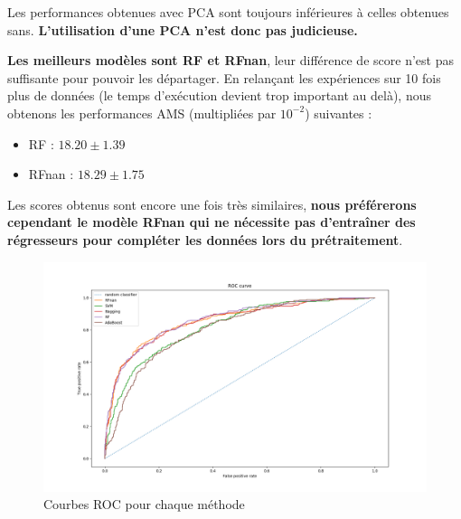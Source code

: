 \documentclass[12pt]{article}
\begin{document}
Les performances obtenues avec PCA sont toujours inférieures à celles obtenues
sans. \textbf{L'utilisation d'une PCA n'est donc pas judicieuse.}


\textbf{Les meilleurs modèles sont RF et RFnan}, leur différence de score n'est
pas suffisante pour pouvoir les départager.  En relançant les expériences sur 10
fois plus de données (le temps d'exécution devient trop important au delà), nous
obtenons les performances AMS (multipliées par $10^{-2}$) suivantes :

\begin{itemize}
    \item RF :     $18.20 \pm 1.39$
    \item RFnan :  $18.29 \pm 1.75$
\end{itemize}

Les scores obtenus sont encore une fois très similaires, \textbf{nous préférerons
cependant le modèle RFnan qui ne nécessite pas d'entraîner des régresseurs pour
compléter les données lors du prétraitement}. 

\begin{figure}[H]
    \center
    \includegraphics[width=\textwidth]{images/ROC_curves.png}
    \caption{Courbes ROC pour chaque méthode}
    \label{img:roc-curves}
\end{figure}
\end{document}
